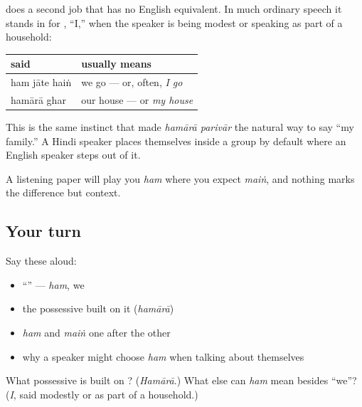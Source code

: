 \begin{grammarlens}[title={Grammar Lens: where Hindi says \textquotedblleft{}we\textquotedblright{} and English says \textquotedblleft{}I\textquotedblright{}}]
\textbf{} does a second job that has no English equivalent. In much ordinary speech it stands in for \textbf{}, \textquotedblleft{}I,\textquotedblright{} when the speaker is being modest or speaking as part of a household:

\noindent
\begin{tabularx}{\linewidth}{@{}>{\raggedright\arraybackslash}X>{\raggedright\arraybackslash}X@{}}
\toprule
\textbf{said} & \textbf{usually means} \\
\midrule
ham jāte haiṅ & we go — or, often, \emph{I go} \\
hamārā ghar & our house — or \emph{my house} \\
\bottomrule
\end{tabularx}

This is the same instinct that made \emph{hamārā parivār} the natural way to say \textquotedblleft{}my family.\textquotedblright{} A Hindi speaker places themselves inside a group by default where an English speaker steps out of it.

A listening paper will play you \emph{ham} where you expect \emph{maiṅ}, and nothing marks the difference but context.
\end{grammarlens}

\subsection*{Your turn}
Say these aloud:

\begin{itemize}
\raggedright
  \item \textquotedblleft{}\textquotedblright{} — \emph{ham}, we
  \item the possessive built on it (\emph{hamārā})
  \item \emph{ham} and \emph{maiṅ} one after the other
  \item why a speaker might choose \emph{ham} when talking about themselves
\end{itemize}

\begin{tcolorbox}[breakable,colback=teal!4,colframe=teal!35!black,title={Before you move on}]
What possessive is built on \textbf{}? (\emph{Hamārā}.) What else can \emph{ham} mean besides \textquotedblleft{}we\textquotedblright{}? (\emph{I}, said modestly or as part of a household.)
\end{tcolorbox}
